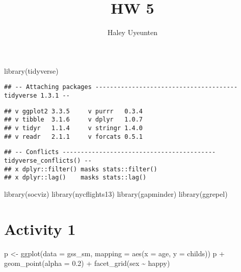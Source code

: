 \documentclass[
]{article}
\title{HW 5}
\author{Haley Uyeunten}
\date{}
\newenvironment{Shaded}{\begin{snugshade}}{\end{snugshade}}
\newcommand{\AttributeTok}[1]{\textcolor[rgb]{0.77,0.63,0.00}{#1}}
\newcommand{\FloatTok}[1]{\textcolor[rgb]{0.00,0.00,0.81}{#1}}
\newcommand{\FunctionTok}[1]{\textcolor[rgb]{0.00,0.00,0.00}{#1}}
\newcommand{\NormalTok}[1]{#1}
\newcommand{\OtherTok}[1]{\textcolor[rgb]{0.56,0.35,0.01}{#1}}
\newcommand{\SpecialCharTok}[1]{\textcolor[rgb]{0.00,0.00,0.00}{#1}}
\begin{document}
\maketitle

\begin{Shaded}
\begin{Highlighting}[]
\FunctionTok{library}\NormalTok{(tidyverse)}
\end{Highlighting}
\end{Shaded}

\begin{verbatim}
## -- Attaching packages --------------------------------------- tidyverse 1.3.1 --
\end{verbatim}

\begin{verbatim}
## v ggplot2 3.3.5     v purrr   0.3.4
## v tibble  3.1.6     v dplyr   1.0.7
## v tidyr   1.1.4     v stringr 1.4.0
## v readr   2.1.1     v forcats 0.5.1
\end{verbatim}

\begin{verbatim}
## -- Conflicts ------------------------------------------ tidyverse_conflicts() --
## x dplyr::filter() masks stats::filter()
## x dplyr::lag()    masks stats::lag()
\end{verbatim}

\begin{Shaded}
\begin{Highlighting}[]
\FunctionTok{library}\NormalTok{(socviz)}
\FunctionTok{library}\NormalTok{(nycflights13)}
\FunctionTok{library}\NormalTok{(gapminder)}
\FunctionTok{library}\NormalTok{(ggrepel)}
\end{Highlighting}
\end{Shaded}

\hypertarget{activity-1}{%
\section{Activity 1}\label{activity-1}}

\begin{Shaded}
\begin{Highlighting}[]
\NormalTok{p }\OtherTok{\textless{}{-}} \FunctionTok{ggplot}\NormalTok{(}\AttributeTok{data =}\NormalTok{ gss\_sm, }\AttributeTok{mapping =} \FunctionTok{aes}\NormalTok{(}\AttributeTok{x =}\NormalTok{ age, }\AttributeTok{y =}\NormalTok{ childs))}
\NormalTok{p }\SpecialCharTok{+} \FunctionTok{geom\_point}\NormalTok{(}\AttributeTok{alpha =} \FloatTok{0.2}\NormalTok{) }\SpecialCharTok{+} \FunctionTok{facet\_grid}\NormalTok{(sex }\SpecialCharTok{\textasciitilde{}}\NormalTok{ happy)}
\end{Highlighting}
\end{Shaded}
\end{document}
